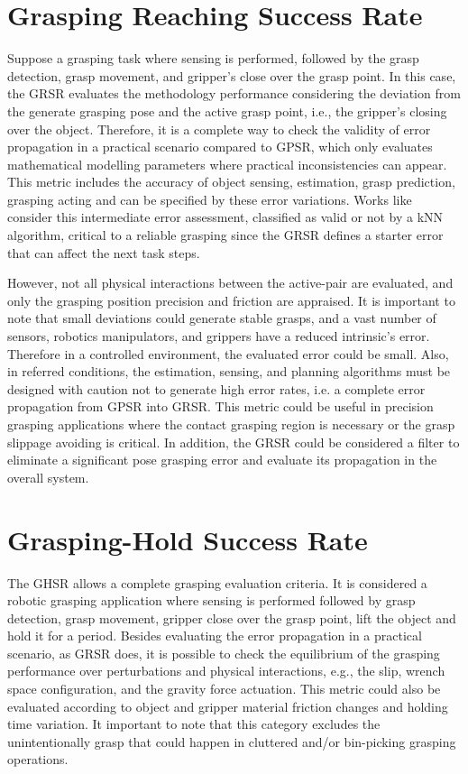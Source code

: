 \section{Grasping Reaching Success Rate} 
\label{cap3:grasping_eval:sec:grsr}

Suppose a grasping task where sensing is performed, followed by the grasp detection, grasp movement, and gripper's close over the grasp point. In this case, the \ac{GRSR} evaluates the methodology performance considering the deviation from the generate grasping pose and the active grasp point, i.e., the gripper's closing over the object. Therefore, it is a complete way to check the validity of error propagation in a practical scenario compared to \ac{GPSR}, which only evaluates mathematical modelling parameters where practical inconsistencies can appear. This metric includes the accuracy of object sensing, estimation, grasp prediction, grasping acting and can be specified by these error variations. Works like~\cite{moreira_2016} consider this intermediate error assessment, classified as valid or not by a kNN algorithm, critical to a reliable grasping since the \ac{GRSR} defines a starter error that can affect the next task steps.

However, not all physical interactions between the active-pair are evaluated, and only the grasping position precision and friction are appraised. It is important to note that small deviations could generate stable grasps, and a vast number of sensors, robotics manipulators, and grippers have a reduced intrinsic's error. Therefore in a controlled environment, the evaluated error could be small. Also, in referred conditions, the estimation, sensing, and planning algorithms must be designed with caution not to generate high error rates, i.e. a complete error propagation from \ac{GPSR} into \ac{GRSR}. This metric could be useful in precision grasping applications where the contact grasping region is necessary or the grasp slippage avoiding is critical. In addition, the \ac{GRSR} could be considered a filter to eliminate a significant pose grasping error and evaluate its propagation in the overall system.


\section{Grasping-Hold Success Rate} 
\label{cap3:grasping_eval:sec:ghsr}

The \ac{GHSR} allows a complete grasping evaluation criteria. It is considered a robotic grasping application where sensing is performed followed by grasp detection, grasp movement, gripper close over the grasp point, lift the object and hold it for a period. Besides evaluating the error propagation in a practical scenario, as \ac{GRSR} does, it is possible to check the equilibrium of the grasping performance over perturbations and physical interactions, e.g., the slip, wrench space configuration, and the gravity force actuation. This metric could also be evaluated according to object and gripper material friction changes and holding time variation. It important to note that this category excludes the unintentionally grasp that could happen in cluttered and/or bin-picking grasping operations.

